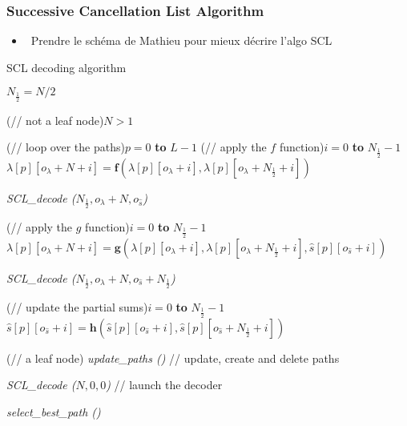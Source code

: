 \subsubsection{Successive Cancellation List Algorithm}

\begin{itemize}
  \item \xmark~Prendre le schéma de Mathieu pour mieux décrire l'algo SCL
\end{itemize}

\begin{algorithm}
  \caption{SCL decoding algorithm}\label{alg:polar_scl}



  {
    $N_{\frac{1}{2}} = N / 2$

    \uIf(// not a leaf node){$N > 1$}
    {
      \For(// loop over the paths){$p=0$ \textbf{to} $L-1$}
      {
        \For(// apply the $f$ function){$i=0$ \textbf{to} $N_{\frac{1}{2}}-1$}
        {
          $\lambda[p][o_\lambda + N + i] = \bm{f}(\lambda[p][o_\lambda + i], \lambda[p][o_\lambda + N_{\frac{1}{2}} + i])$
        }
      }

      \textit{SCL\_decode ($N_{\frac{1}{2}}, o_{\lambda} + N, o_{\hat{s}}$)}

      {
        \For(// apply the $g$ function){$i=0$ \textbf{to} $N_{\frac{1}{2}}-1$}
        {
          $\lambda[p][o_\lambda + N + i] = \bm{g}(\lambda[p][o_\lambda + i], \lambda[p][o_\lambda + N_{\frac{1}{2}} + i], \hat{s}[p][o_{\hat{s}} + i])$
        }
      }

      \textit{SCL\_decode ($N_{\frac{1}{2}}, o_{\lambda} + N, o_{\hat{s}} + N_{\frac{1}{2}}$)}

      {
        \For(// update the partial sums){$i=0$ \textbf{to} $N_{\frac{1}{2}}-1$}
        {
          $\hat{s}[p][o_{\hat{s}} + i] = \bm{h}(\hat{s}[p][o_{\hat{s}} + i], \hat{s}[p][o_{\hat{s}} + N_{\frac{1}{2}} + i])$
        }
      }
    }
    \Else(// a leaf node)
    {
      \textit{update\_paths ()} // update, create and delete paths
    }
  }

  \textit{SCL\_decode ($N, 0, 0$)} // launch the decoder

  \textit{select\_best\_path ()}
\end{algorithm}

